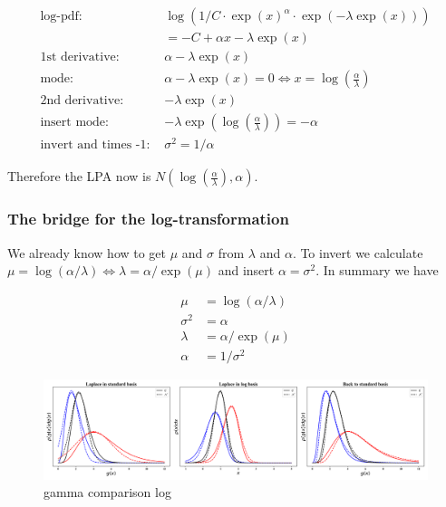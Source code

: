 \documentclass{article}
\begin{document}
\begin{align}
\text{log-pdf: } &\log\left(1/C \cdot \exp(x)^{\alpha} \cdot \exp(-\lambda \exp(x)) \right) \\
&= -C + \alpha x - \lambda \exp(x)\\
\text{1st derivative: }&  \alpha - \lambda \exp(x)\\
\text{mode: }& \alpha - \lambda \exp(x) = 0 \Leftrightarrow x = \log\left(\frac{\alpha}{\lambda}\right)\\
\text{2nd derivative: }&  -\lambda \exp(x)\\
\text{insert mode: }& -\lambda \exp(\log\left(\frac{\alpha}{\lambda}\right)) = -\alpha \\
\text{invert and times -1: }&\sigma^2 = 1/\alpha 
\end{align}

Therefore the LPA now is $N(\log\left(\frac{\alpha}{\lambda}\right), \alpha)$.

\subsubsection{The bridge for the log-transformation}

We already know how to get $\mu$ and $\sigma$ from $\lambda$ and $\alpha$. To invert we calculate $\mu = \log(\alpha/\lambda) \Leftrightarrow \lambda= \alpha/\exp(\mu)$ and insert $\alpha=\sigma^2$. In summary we have

\begin{align}
\mu &= \log(\alpha/\lambda) \\
\sigma^2 &= \alpha \\
\lambda &= \alpha/\exp(\mu) \\
\alpha &= 1/\sigma^2
\end{align}

\begin{figure}[!htb]
	\centering
	\includegraphics[width=\textwidth]{figures/gamma_bridge_log.pdf}
	\caption{gamma comparison log}
	\label{fig:gamma_comparison}
\end{figure} 
\end{document}
